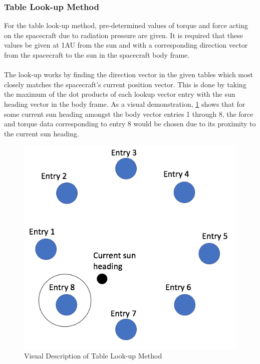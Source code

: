 \subsubsection{Table Look-up Method}
For the table look-up method, pre-determined values of torque and force acting on the spacecraft due to radiation pressure are given. It is required that these values be given at 1AU from the sun and with a corresponding direction vector from the spacecraft to the sun in the spacecraft body frame.\\\\
The look-up works by finding the direction vector in the given tables which most closely matches the spacecraft's current position vector. This is done by taking the maximum of the dot products of each lookup vector entry with the sun heading vector in the body frame. As a visual demonstration, \ref{fig:lookupMethod} shows that for some current sun heading amongst the body vector entries 1 through 8, the force and torque data corresponding to entry 8 would be chosen due to its proximity to the current sun heading.
\begin{figure}[H]
	\centerline{
		\includegraphics[height=0.5\textwidth, keepaspectratio]{Figures/lookupDiagram}}
	\caption{Visual Description of Table Look-up Method}
	\label{fig:lookupMethod}
\end{figure}



